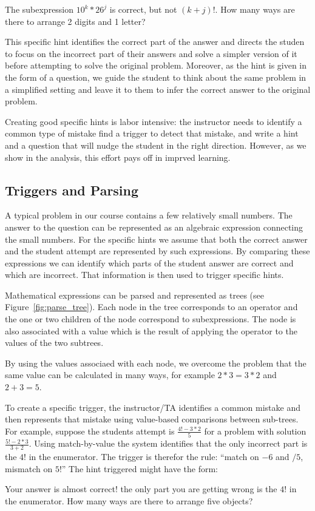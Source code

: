 \documentclass{sigchi/sigchi}
\begin{document}
\begin{displayquote}
The subexpression $10^k*26^j$ is correct, but not $(k+j)!$. How many
ways are there to arrange 2 digits and 1 letter? 
\end{displayquote}

This specific hint identifies the correct part of the answer and
directs the studen to focus on the incorrect part of their answers and
solve a simpler version of it before attempting to solve the original
problem. Moreover, as the hint is given in the form of a question, we
guide the student to think about the same problem in a simplified
setting and leave it to them to infer the correct answer to the
original problem. 

Creating good specific hints is labor intensive: the instructor needs
to identify a common type of mistake find a trigger to detect that
mistake, and write a hint and a question that will nudge the student
in the right direction. However, as we show in the analysis, this
effort pays off in imprved learning.

\subsection*{Triggers and Parsing}

A typical problem in our course contains a few relatively small numbers. The
answer to the question can be represented as an algebraic expression
connecting the small numbers. For the specific hints we assume that
both the correct answer and the student attempt are represented by
such expressions. By comparing these expressions we can identify which
parts of the student answer are correct and which are incorrect. That
information is then used to trigger specific hints.

Mathematical expressions can be parsed and represented as trees (see
Figure~\ref{fig:parse_tree}). Each node in the tree corresponds to an
operator and the one or two children of the node correspond to
subexpressions. The node is also associated with a value which is the
result of applying the operator to the values of the two subtrees.

By using the values associaed with each node, we overcome the problem
that the same value can be calculated in many ways, for example $2*3 =
3*2$ and $2+3=5$. 

To create a specific trigger, the instructor/TA identifies a common
mistake and then represents that mistake using value-based comparisons
between sub-trees. For example,
suppose the students attempt is $\frac{4!-3*2}{5}$
for a problem with solution $\frac{5!-2*3}{3+2}$. Using match-by-value
the system identifies that the only incorrect part is the $4!$ in the enumerator.
The trigger is therefor the rule: ``match on $-6$ and $/5$, mismatch on $5!$''
The hint triggered might have the form:
\begin{displayquote}
Your answer is almost correct! the only part you are getting wrong is
the $4!$ in the enumerator. How many ways are there to arrange five objects?
\end{displayquote}
\end{document}
